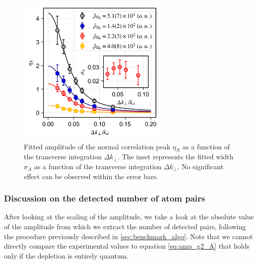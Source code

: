 \begin{figure}
    \centering
    \includegraphics[width=0.65\textwidth]{Fig/Chapter4/eta_vs_int_kmk.png}
    \caption{Fitted amplitude of the normal correlation peak $\eta_N$ as a function of the transverse integration $\Delta k_{\perp}$. The inset represents the fitted width $\sigma_A$ as a function of the transverse integration $\Delta k_{\perp}$. No significant effect can be observed within the error bars.}
    \label{fig:eta_vs_int_kmk}
\end{figure}

\subsubsection{Discussion on the detected number of atom pairs}

After looking at the scaling of the amplitude, we take a look at the absolute value of the amplitude from which we extract the number of detected \kmk pairs, following the procedure previously described in \ref{sec:benchmark_algo}. Note that we cannot directly compare the experimental values to equation \ref{eq:amp_g2_A} that holds only if the depletion is entirely quantum.


